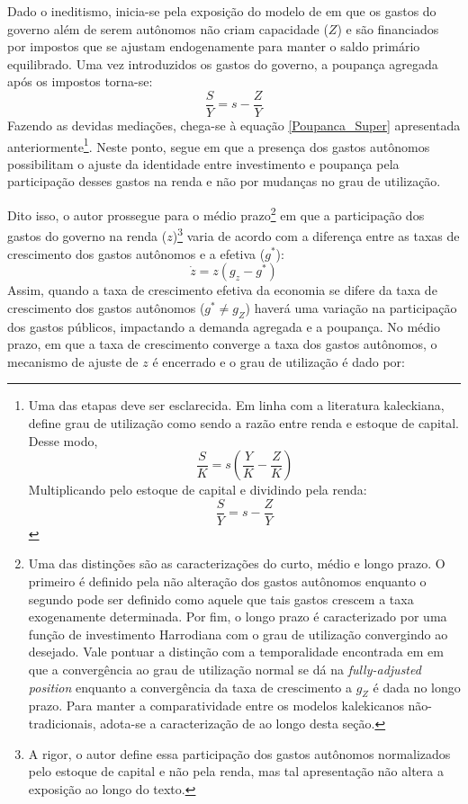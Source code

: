 Dado o ineditismo, inicia-se pela exposição do modelo de \textcite{allain_macroeconomic_2014} em que os gastos do governo além de serem autônomos não criam capacidade ($Z$) e são financiados por impostos que se ajustam endogenamente para manter o saldo primário equilibrado.  Uma vez introduzidos os gastos do governo, a poupança agregada após os impostos torna-se:
$$
\frac{S}{Y} = s - \frac{Z}{Y}
$$
Fazendo as devidas mediações, chega-se à equação \ref{Poupanca_Super} apresentada anteriormente\footnote{Uma das etapas deve ser esclarecida. Em linha com a literatura kaleckiana, \textcite{allain_macroeconomic_2014} define grau de utilização como sendo a razão entre renda e estoque de capital. Desse modo, 
$$
\frac{S}{K} = s\left(\frac{Y}{K} - \frac{Z}{K}\right) 
$$
Multiplicando pelo estoque de capital e dividindo pela renda:
$$
\frac{S}{Y} = s - \frac{Z}{Y}
$$}. 
Neste ponto, \textcite[p.~10]{allain_macroeconomic_2014} segue \textcite{serrano_sraffian_1995} em que a presença dos gastos autônomos possibilitam o ajuste da identidade entre investimento e poupança pela participação desses gastos na renda e não por mudanças no grau de utilização. 

Dito isso, o autor prossegue para o médio prazo\footnote{
	Uma das distinções \textcite{allain_macroeconomic_2014} são as caracterizações do curto, médio e longo prazo. O primeiro é definido pela não alteração dos gastos autônomos enquanto o segundo pode ser definido como aquele que tais gastos crescem a taxa exogenamente determinada. Por fim, o longo prazo é caracterizado por uma função de investimento Harrodiana com o grau de utilização convergindo ao desejado. Vale pontuar a distinção com a temporalidade encontrada em \textcite{freitas_growth_2015} em que a convergência ao grau de utilização normal se dá na \textit{fully-adjusted position} enquanto a convergência da taxa de crescimento a $g_Z$ é dada no longo prazo. Para manter a comparatividade entre os modelos kalekicanos não-tradicionais, adota-se a caracterização de \textcite{allain_macroeconomic_2014} ao longo desta seção.
} em que a participação dos gastos do governo na renda ($z$)\footnote{A rigor, o autor define essa participação dos gastos autônomos normalizados pelo estoque de capital e não pela renda, mas tal apresentação não altera a exposição ao longo do texto.} varia de acordo com a diferença entre as taxas de crescimento dos gastos autônomos e a efetiva ($g^*$):
\begin{equation}
    \dot z = z (g_z - g^*)
\end{equation}
Assim, quando a taxa de crescimento efetiva da economia se difere da taxa de crescimento dos gastos autônomos ($g^*\neq g_Z$)  haverá uma variação na participação dos gastos públicos, impactando a demanda agregada e a poupança. No médio prazo, em que a taxa de crescimento converge a taxa dos gastos autônomos, o mecanismo de ajuste de $z$ é encerrado e o grau de utilização é dado por:

